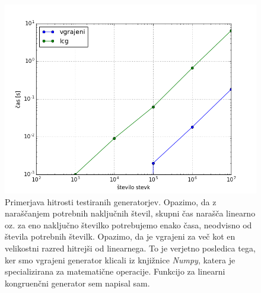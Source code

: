 \documentclass[slovene,11pt,a4paper]{article}
\numberwithin{equation}{section} %
\numberwithin{figure}{section} %
\numberwithin{table}{section} %
\begin{document}
\begin{figure}[h]
\begin{center}
\includegraphics[scale=0.4]{slike/casovna_odvisnost.png}
\end{center}
\caption{Primerjava hitrosti testiranih generatorjev. Opazimo, da z naraščanjem potrebnih naključnih števil, skupni čas narašča linearno oz. za eno naključno številko potrebujemo enako časa, neodvisno od števila potrebnih številk. Opazimo, da je vgrajeni za več kot en velikostni razred hitrejši od linearnega. To je verjetno posledica tega, ker smo vgrajeni generator klicali iz knjižnice \textit{Numpy}, katera je specializirana za matematične operacije. Funkcijo za linearni kongruenčni generator sem napisal sam.}
\end{figure}
\end{document}

